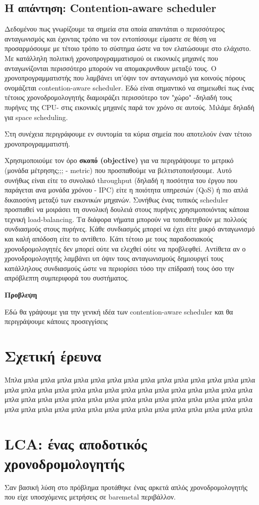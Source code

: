 \subsection{Η απάντηση: Contention-aware scheduler}
Δεδομένου πως γνωρίζουμε τα σημεία στα οποία απαντάται ο περισσότερος
ανταγωνισμός και έχοντας τρόπο να τον εντοπίσουμε είμαστε σε θέση να
προσαρμόσουμε με τέτοιο τρόπο το σύστημα ώστε να τον ελατώσουμε στο ελάχιστο. Με
κατάλληλη πολιτική χρονοπρογραμματισμού οι εικονικές μηχανές που ανταγωνίζονται
περισσότερο μπορούν να απομακρυνθουν μεταξύ τους. Ο χρονοπρογραμματιστής που
λαμβάνει υπ'όψιν τον ανταγωνισμό για κοινούς πόρους ονομάζεται contention-aware
scheduler. Εδώ είναι σημαντικό να σημειωθεί πως ένας τέτοιος χρονοδρομολογητής
διαμοιράζει περισσότερο τον "χώρο" -δηλαδή τους πυρήνες της CPU- στις εικονικές
μηχανές παρά τον χρόνο σε αυτούς. Μιλάμε δηλαδή για space scheduling.

Στη συνέχεια περιγράφουμε εν συντομία τα κύρια σημεία που αποτελούν έναν τέτοιο
χρονοπρογραμματιστή.

Χρησιμοποιούμε τον όρο \textbf{σκοπό (objective)} για να περιγράψουμε το μετρικό (μονάδα
μέτρησης;;; - metric) που προσπαθούμε να βελτιστοποιήσουμε. Αυτό συνήθως είναι
είτε το συνολικό throughput (δηλαδή η ποσότητα του έργου που παράγεται ανα
μονάδα χρόνου - IPC) είτε η ποιότητα υπηρεσιών (QoS) ή πιο απλά δικαιοσύνη
μεταξύ των εικονικών μηχανών. Συνήθως ένας τυπικός scheduler προσπαθεί να
μοιράσει τη συνολική δουλειά στους πυρήνες χρησιμοποιόντας κάποια τεχνική
load-balancing. Τα διάφορα νήματα μπορούν να τοποθετηθούν με πολλούς συνδιασμούς
στους πυρήνες. Κάθε συνδιασμός μπορεί να έχει είτε μικρό ανταγωνισμό και καλή
απόδοση είτε το αντίθετο. Κάτι τέτοιο με τους παραδοσιακούς χρονοδρομολογητές δεν
μπορεί ούτε να ελεχθεί ούτε να προβλεφθεί. Αντίθετα αν ο χρονοδρομολογητής
λαμβάνει υπ όψιν τους ανταγωνισμούς δημιουργεί τους κατάλληλους συνδιασμούς ώστε
να περιορίσει τόσο την επίδρασή τους όσο την απρόβλεπτη συμπεριφορά του
συστήματος.

\textbf{Προβλεψη} 



Εδώ θα γράψουμε για την γενική ιδέα των contention-aware scheduler και θα
περιγράψουμε κάποιες προσεγγίσεις



\section{Σχετική έρευνα}
Μπλα μπλα μπλα μπλα μπλα μπλα μπλα μπλα μπλα μπλα μπλα μπλα μπλα μπλα μπλα 
μπλα μπλα μπλα μπλα μπλα μπλα μπλα μπλα μπλα μπλα μπλα μπλα μπλα μπλα μπλα 
μπλα μπλα μπλα μπλα μπλα μπλα μπλα μπλα μπλα μπλα μπλα μπλα μπλα μπλα μπλα 
μπλα μπλα μπλα μπλα μπλα μπλα μπλα μπλα μπλα μπλα μπλα μπλα μπλα μπλα μπλα 
\section{LCA: ένας αποδοτικός χρονοδρομολογητής}
Σαν βασική λύση στο πρόβλημα προτάθηκε ένας αρκετά απλός χρονοδρομολογητής που
είχε υποσχόμενες μετρήσεις σε baremetal περιβάλλον.
